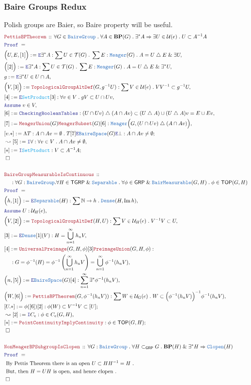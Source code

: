 \documentclass[12pt]{scrartcl}
\newcommand{\TYPE}[1]{\textcolor{NavyBlue}{\mathtt{#1}}}
\newcommand{\FUNC}[1]{\textcolor{Cerulean}{\mathtt{#1}}}
\newcommand{\LOGIC}[1]{\textcolor{Blue}{\mathtt{#1}}}
\newcommand{\THM}[1]{\textcolor{Maroon}{\mathtt{#1}}}
\renewcommand{\.}{\; . \;}
\newcommand{\de}{: \kern 0.1pc =}
\newcommand{\Theorem}[2]{& \THM{#1} \, :: \, #2 \\ & \Proof = \\ }
\newcommand{\NewLine}{\\ & \kern 1pc}
\newcommand{\Page}[1]{ \begin{align*} #1 \end{align*}   }
\newcommand{\Explain}[1]{& \text{#1.} \\}
\renewcommand{\And}{\; \& \;}
\newcommand{\Imply}{\Rightarrow}
\newcommand{\Nat}{\mathbb{N} }
\DeclareMathOperator*{\im}{Im}
\newcommand{\du}{\; \triangle \;}
\newcommand{\Say}[3]{& #1 \de #2 : #3, \\}
\newcommand{\SayIn}[3]{& #1 \de #2 \in #3, \\}
\newcommand{\Conclude}[3]{& #1 \de #2 : #3; \\}
\newcommand{\Derive}[3]{& \leadsto #1 \de #2 : #3, \\}
\newcommand{\Assume}[2]{& \LOGIC{Assume} \; #1 : #2, \\}
\newcommand{\AssumeIn}[2]{& \LOGIC{Assume} \; #1 \in #2, \\}
\newcommand{\Intro}{\LOGIC{I}}
\newcommand{\Elim}{\LOGIC{E}}
\newcommand{\QED}{\; \square}
\newcommand{\EndProof}{& \QED \\}
\newcommand{\Proof}{\LOGIC{Proof} \; }
\newcommand{\Dense}{\TYPE{Dense}}
\newcommand{\Separable}{\TYPE{Separable}}
\newcommand{\Clopen}{\TYPE{Clopen}}
\newcommand{\Bair}{\TYPE{BaireSpace}}
\newcommand{\Meager}{\TYPE{Meager}}
\newcommand{\TOP}{\mathsf{TOP}}
\newcommand{\T}{\mathcal{T}}
\renewcommand{\U}{\mathcal{U}}
\newcommand{\BP}{\mathbf{BP}}
\newcommand{\BM}{\TYPE{BairMeasurable}}
\newcommand{\GRP}{\mathsf{GRP}}
\newcommand{\BG}{\TYPE{BaireGroup}}
\newcommand{\TGRP}{\mathsf{TGRP}}
\begin{document}
\subsubsection{Baire Groups Redux}
Polish groups are Baier, so Baire property will be useful.
\Page{
	\Theorem{PettisBPTheorem}
	{
		\forall G \in  \BG \.
		\forall A \in \BP(G) \.
		\exists^* A \Imply
		\exists U \in \U(e) \. U \subset A^{-1} A
	}
	\Say{\Big(U,E,[1]\Big)}
	{
		\Elim \exists^* A
	}
	{
		\sum U \in \T(G) \.
		\sum E : \Meager(G) \.		
		A = U \du E
		\And
		\exists U 
	}
	\Say{\Big([2]\Big)}
	{
		\Elim \exists^* A
	}
	{
		\sum U \in \T(G) \.
		\sum E : \Meager(G) \.		
		A = U \du E
		\And
		\exists^* U 
	}
	\SayIn{g}{\Elim \exists^* U}
	{
		U \cap A
	}
	\Say{\Big( V,[3]\Big)}
	{
		\THM{TopologicalGroupAltDef}(G,g^{-1}U)
	}
	{
		\sum V \in \U(e) \. VV^{-1} \subset g^{-1}U
	}
	\Say{[4]}{\Elim \FUNC{SetProduct}[3]}
	{
		\forall v \in V \.    gV \subset U \cap Uv
	}
	\AssumeIn{v}{V}
	\Say{[6]}{\LOGIC{CheckingBooleanTables}}
	{
		(U \cap Uv) \du (A \cap Av) 
		\subset (U \du A) \cup  (U \du A)v =
		E \cup Ev		
	}
	\Say{[7]}{\THM{MeagerUnion}(G)\THM{MeagerSubset}(G)[6]}
	{
		\Meager\Big( G, (U \cap Uv) \du (A \cap Av) \Big)
	}
	\Conclude{[v.*]}
	{
		\Lambda T : A \cap Av = \emptyset \. 
		T[7]\Elim \Bair(G)\Elim \bot
	}
	{
		A \cap Av \neq \emptyset
	}
	\Derive{[5]}{\Intro \forall}
	{
		\forall v \in V \.  A \cap Av \neq \emptyset
	}
	\Conclude{[*]}{\Intro \FUNC{SetPtoduct}}
	{
		V \subset A^{-1}A
	}
	\EndProof
	\\
	\Theorem{BaireGroupMeasurableIsContinuous}
	{
		\NewLine :		
		\forall G  : \BG.
		\forall H \in \TGRP \And \Separable \.
		\forall \phi \in \GRP\And\BM(G,H) \.
		\phi \in \TOP(G,H)
	}
	\Say{\Big(h,[1]\Big)}{\Elim \Separable(H)}
	{
		\sum \Nat \to h \. \Dense(H,\im h)
	}
	\Assume{U}{\U_H(e)}
	\Say{\Big(V,[2]\Big)}
	{
		\THM{TopologicalGroupAltDef}(H,U)
	}
	{
		\sum V \in \U_H(e) \. V^{-1}V \subset U
	}
	\Say{[3]}{\Elim \Dense [1](V)}{H = \bigcup^\infty_{n=1} h_n V}
	\Say{[4]}{\THM{UniversalPreimage}(G,H,\phi)[3]\THM{PreimageUnion}(G,H,\phi)}
	{
		\NewLine :		
		G = \phi^{-1}(H) =
		\phi^{-1} \left(\bigcup^\infty_{n=1} h_n V\right) =
		\bigcup^\infty_{n=1} \phi^{-1}(h_n V)
	}
	\Say{\Big(n,[5]\Big)}
	{
		\Elim \Bair(G)[4]
	}
	{
		\sum^\infty_{n=1} \exists^* \phi^{-1}(h_n V)
	}
	\Say{\Big(W,[6]\Big) }{\THM{PettisBPTheorem}(G,\phi^{-1}(h_n V))}
	{
		\sum W \in \U_G(e) \.  
		W \subset  \Big(\phi^{-1}(h_n V)\Big)^{-1} \phi^{-1}(h_n V)
	}
	\Conclude{[U.*]}{\phi([6])[2]}
	{
		\phi(W) \subset V^{-1}V \subset [U]
	}
	\Derive{[2]}{\Intro C_e}{\phi \in C_e(G,H)}
	\Conclude{[*]}{\THM{PointContinuityImplyContinuity}}
	{
		\phi \in \TOP(G,H)
	}
	\EndProof
	\\
	\Theorem{
		NonMeagerBPSubgroupIsClopen
	}
	{
		\forall G : \BG \.
		\forall H \subset_\GRP G \.
		\BP(H) \And \exists^* H \Imply \Clopen(H)
	}
	\Explain{
		By Pettis Theorem there is an open $U\subset HH^{-1} = H$
	}
	\Explain{
		But, then $H  = UH$ is open, and hence clopen	
	}
	\EndProof	
}
\end{document}
